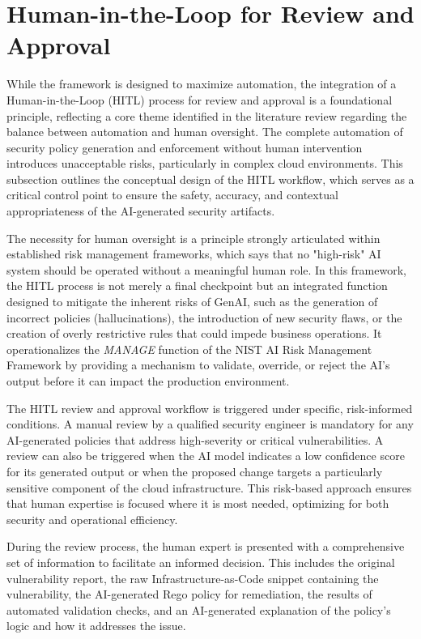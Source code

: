 
\section{Human-in-the-Loop for Review and Approval} %
\label{sub:Human-in-the-Loop for Review and Approval}

While the framework is designed to maximize automation, the integration of a Human-in-the-Loop (HITL) process for review and approval is a foundational principle, reflecting a core theme identified in the literature review regarding the balance between automation and human oversight. The complete automation of security policy generation and enforcement without human intervention introduces unacceptable risks, particularly in complex cloud environments. This subsection outlines the conceptual design of the HITL workflow, which serves as a critical control point to ensure the safety, accuracy, and contextual appropriateness of the AI-generated security artifacts.

The necessity for human oversight is a principle strongly articulated within established risk management frameworks, which says that no "high-risk" AI system should be operated without a meaningful human role. In this framework, the HITL process is not merely a final checkpoint but an integrated function designed to mitigate the inherent risks of GenAI, such as the generation of incorrect policies (hallucinations), the introduction of new security flaws, or the creation of overly restrictive rules that could impede business operations. It operationalizes the \textit{MANAGE} function of the NIST AI Risk Management Framework by providing a mechanism to validate, override, or reject the AI's output before it can impact the production environment\cite{barrett_actionable_2023}.

The HITL review and approval workflow is triggered under specific, risk-informed conditions. A manual review by a qualified security engineer is mandatory for any AI-generated policies that address high-severity or critical vulnerabilities. A review can also be triggered when the AI model indicates a low confidence score for its generated output or when the proposed change targets a particularly sensitive component of the cloud infrastructure. This risk-based approach ensures that human expertise is focused where it is most needed, optimizing for both security and operational efficiency.

During the review process, the human expert is presented with a comprehensive set of information to facilitate an informed decision. This includes the original vulnerability report, the raw Infrastructure-as-Code snippet containing the vulnerability, the AI-generated Rego policy for remediation, the results of automated validation checks, and an AI-generated explanation of the policy’s logic and how it addresses the issue.

